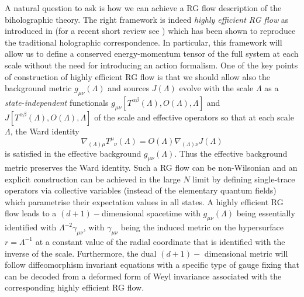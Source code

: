 \documentclass[prd,reprint,a4paper,showpacs,superscriptaddress,11pt,onecolumn,nofootinbib]{revtex4-1}
\renewcommand{\(}{\left(}
\renewcommand{\)}{\right)}
\newcommand{\6}{\partial}
\begin{document}
A natural question to ask is how we can achieve a RG flow description of the biholographic theory. The right framework is indeed \textit{highly efficient RG flow} as introduced in \cite{Behr:2015yna,Behr:2015aat} (for a recent short review see \cite{Mukhopadhyay:2016fre}) which has been shown to reproduce the traditional holographic correspondence. In particular, this framework will allow us to define a conserved energy-momentum tensor of the full system at each scale without the need for introducing an action formalism. One of the key points of construction of highly efficient RG flow is that we should allow also the background metric $g_{\mu\nu}(\Lambda)$ and sources $J(\Lambda)$ evolve with the scale $\Lambda$ as a \textit{state-independent} functionals $g_{\mu\nu}[T^{\alpha\beta}(\Lambda), O(\Lambda), \Lambda]$ and $J[T^{\alpha\beta}(\Lambda), O(\Lambda), \Lambda]$ of the scale and effective operators so that at each scale $\Lambda$, the Ward identity
\begin{equation}
\nabla_{(\Lambda)\mu} T^\mu_{\phantom{\mu}\nu}(\Lambda) = O(\Lambda)\nabla_{(\Lambda)\nu} J(\Lambda)
\end{equation}
is satisfied in the effective background $g_{\mu\nu}(\Lambda)$. Thus the effective background metric preserves the Ward identity. Such a RG flow can be non-Wilsonian and an explicit construction can be achieved in the large $N$ limit by defining single-trace operators via collective variables (instead of the elementary quantum fields) which parametrise their expectation values in all states. A highly efficient RG flow leads to a $(d+1)-$dimensional spacetime with $g_{\mu\nu}(\Lambda)$ being essentially identified with $\Lambda^{-2}\gamma_{\mu\nu}$, with $\gamma_{\mu\nu}$ being the induced metric on the hypersurface $r =\Lambda^{-1}$ at a constant value of the radial coordinate that is identified with the inverse of the scale. Furthermore, the dual $(d+1)-$ dimensional metric will follow diffeomorphism invariant equations with a specific type of gauge fixing that can be decoded from a deformed form of Weyl invariance associated with the corresponding highly efficient RG flow.
\end{document}
